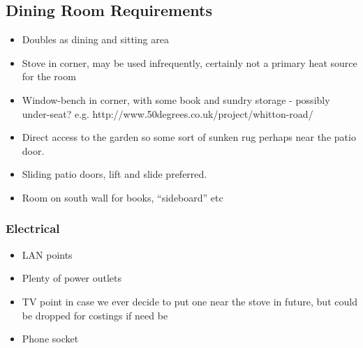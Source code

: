 \subsection{Dining Room Requirements}
\begin{itemize}
\item Doubles as dining and sitting area
\item Stove in corner, may be used infrequently, certainly not a primary heat source for the room
\item Window-bench in corner, with some book and sundry storage - possibly under-seat? e.g. http://www.50degrees.co.uk/project/whitton-road/
\item Direct access to the garden so some sort of sunken rug perhaps near the patio door.
\item Sliding patio doors, lift and slide preferred.
\item Room on south wall for books, ``sideboard'' etc
    

\end{itemize}

\subsubsection{Electrical}
\begin{itemize}
\item LAN points
\item Plenty of power outlets
\item TV point in case we ever decide to put one near the stove in future, but could be dropped for costings if need be
\item Phone socket   
\end{itemize}
